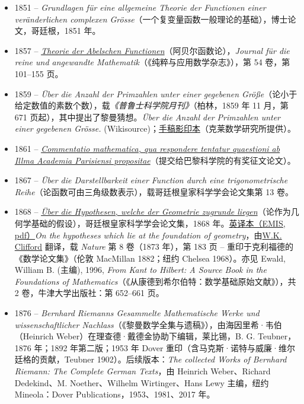 \begin{itemize}
\tightlist
\item
  {1851 -- \emph{Grundlagen für eine allgemeine Theorie der Functionen einer veränderlichen complexen Grösse}（一个复变量函数一般理论的基础），博士论文，哥廷根，1851 年。}
\item
  {1857 -- \emph{\href{https://en.wikipedia.org/wiki/List_of_important_publications_in_mathematics\#Theorie_der_Abelschen_Functionen}{Theorie der Abelschen Functionen}}（阿贝尔函数论），\emph{Journal für die reine und angewandte Mathematik}（《纯粹与应用数学杂志》），第 54 卷，第 101--155 页。}
\item
  {1859 -- \emph{Über die Anzahl der Primzahlen unter einer gegebenen Größe}（论小于给定数值的素数个数），载\emph{《普鲁士科学院月刊》}（柏林，1859 年 11 月，第 671 页起），其中提出了黎曼猜想。\emph{Über die Anzahl der Primzahlen unter einer gegebenen Grösse.} (Wikisource)；\href{http://www.claymath.org/sites/default/files/riemann1859.pdf}{手稿影印本}（克莱数学研究所提供）。}
\item
  {1861 -- \emph{\href{https://www.maths.tcd.ie/pub/HistMath/People/Riemann/Paris/}{Commentatio mathematica, qua respondere tentatur quaestioni ab Illma Academia Parisiensi propositae}}（提交给巴黎科学院的有奖征文论文）。}
\item
  {1867 -- \emph{Über die Darstellbarkeit einer Function durch eine trigonometrische Reihe}（论函数可由三角级数表示），载哥廷根皇家科学学会论文集第 13 卷。}
\item
  {1868 -- \href{http://resolver.sub.uni-goettingen.de/purl?GDZPPN002019213}{\emph{Über die Hypothesen, welche der Geometrie zugrunde liegen}}（论作为几何学基础的假设），哥廷根皇家科学学会论文集，1868 年。\href{https://www.emis.de/classics/Riemann/WKCGeom.pdf}{英译本（EMIS, pdf）}\emph{On the hypotheses which lie at the foundation of geometry}，由\href{https://en.wikipedia.org/wiki/William_Kingdon_Clifford}{W.K. Clifford} 翻译，载 \emph{Nature} 第 8 卷（1873 年），第 183 页 -- 重印于克利福德的《数学论文集》（伦敦 MacMillan 1882；纽约 Chelsea 1968）。亦见 Ewald, William B. (主编), 1996, \emph{From Kant to Hilbert: A Source Book in the Foundations of Mathematics}（《从康德到希尔伯特：数学基础原始文献》），共 2 卷，牛津大学出版社：第 652--661 页。}
\item
  {1876 -- \emph{Bernhard Riemann\textquotesingle s Gesammelte Mathematische Werke und wissenschaftlicher Nachlass}（《黎曼数学全集与遗稿》），由海因里希·韦伯（Heinrich Weber）在理查德·戴德金协助下编辑，莱比锡，B. G. Teubner，1876 年；1892 年第二版；1953 年 Dover 重印（含马克斯·诺特与威廉·维尔廷格的贡献，Teubner 1902）。后续版本：\emph{The collected Works of Bernhard Riemann: The Complete German Texts}，由 Heinrich Weber、Richard Dedekind、M. Noether、Wilhelm Wirtinger、Hans Lewy 主编，纽约 Mineola：Dover Publications，1953、1981、2017 年。}

\end{itemize}
